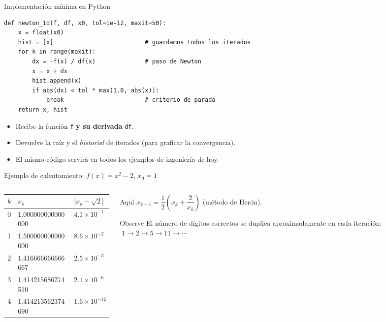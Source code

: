 \documentclass[aspectratio=169,11pt]{beamer}
\begin{document}
\begin{frame}[fragile]{Implementación mínima en Python}
\begin{lstlisting}
def newton_1d(f, df, x0, tol=1e-12, maxit=50):
    x = float(x0)
    hist = [x]                          # guardamos todos los iterados
    for k in range(maxit):
        dx = -f(x) / df(x)              # paso de Newton
        x = x + dx
        hist.append(x)
        if abs(dx) < tol * max(1.0, abs(x)):
            break                       # criterio de parada
    return x, hist
\end{lstlisting}
  \begin{itemize}
    \item Recibe la función \texttt{f} \textbf{y su derivada} \texttt{df}.
    \item Devuelve la raíz y el \emph{historial} de iterados (para graficar la convergencia).
    \item El mismo código servirá en todos los ejemplos de ingeniería de hoy.
  \end{itemize}
\end{frame}

\begin{frame}{Ejemplo de calentamiento: $f(x)=x^2-2$, $x_0=1$}
  \begin{columns}[c]
    \begin{column}{0.5\textwidth}
      \centering
      \begin{tabular}{@{}cll@{}}
        \toprule
        $k$ & $x_k$ & $|x_k-\sqrt2|$ \\
        \midrule
        0 & 1.000000000000000 & $4.1\times10^{-1}$ \\
        1 & 1.500000000000000 & $8.6\times10^{-2}$ \\
        2 & 1.416666666666667 & $2.5\times10^{-3}$ \\
        3 & 1.414215686274510 & $2.1\times10^{-6}$ \\
        4 & 1.414213562374690 & $1.6\times10^{-12}$ \\
        \bottomrule
      \end{tabular}
    \end{column}
    \begin{column}{0.48\textwidth}
      Aquí $x_{k+1}=\dfrac12\left(x_k+\dfrac{2}{x_k}\right)$ (método de Herón).
      \medskip
      \begin{block}{Observe}
        El número de dígitos correctos \alert{se duplica} aproximadamente en cada iteración: $\;1\to2\to5\to11\to\cdots$
      \end{block}
    \end{column}
  \end{columns}
\end{frame}
\end{document}
